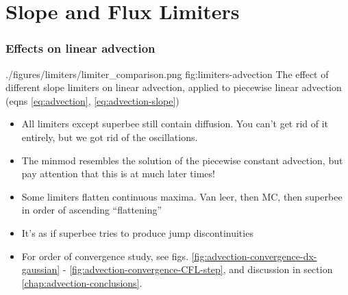 \section{Slope and Flux Limiters}







\subsubsection{Effects on linear advection}


\quickfigcap
	{./figures/limiters/limiter_comparison.png}
	{fig:limiters-advection}
	{The effect of different slope limiters on linear advection, applied to piecewise linear advection (eqns \ref{eq:advection}, \ref{eq:advection-slope})}




\begin{itemize}

	\item All limiters except superbee still contain diffusion. You can't get rid of it entirely, but we got rid of the oscillations.
	
	\item The minmod resembles the solution of the piecewise constant advection, but pay attention that this is at much later times!
	
	\item Some limiters flatten continuous maxima. Van leer, then MC, then superbee in order of ascending ``flattening''
	
	\item It's as if superbee tries to produce jump discontinuities
	
	\item For order of convergence study, see figs. \ref{fig:advection-convergence-dx-gaussian} - \ref{fig:advection-convergence-CFL-step}, and discussion in section \ref{chap:advection-conclusions}.

\end{itemize}






